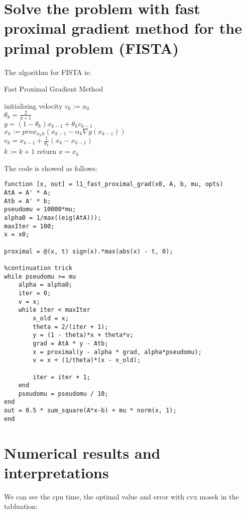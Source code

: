 \documentclass[11pt, oneside]{article}   	%
\begin{document}
\section{Solve the problem with fast proximal gradient method for the primal problem (FISTA)}
The algorithm for FISTA is:\\
\begin{algorithm}[H]
  \SetAlgoNoLine
  \caption{Fast Proximal Gradient Method} 
  initializing velocity $v_{0}:=x_{0}$\\
  { 
  $\theta_k=\frac{2}{k+1}$\\  
  $y=(1-\theta_{k})x_{k-1}+\theta_{k}v_{k-1}$\\
  $x_{k}:=prox_{\alpha_{k}h}\left(x_{k-1}-\alpha_{k}\nabla g(x_{k-1})\right)$\\
  $v_{k}=x_{k-1}+\frac{1}{\theta_{k}}(x_{k}-x_{k-1})$\\
  $k:=k+1$
  }
  return $x=x_{k}$\; 
\end{algorithm}
The code is showed as follows:
\lstset{
 frame=single, 
breaklines=true,
language=MATLAB,
 }
\begin{lstlisting}
function [x, out] = l1_fast_proximal_grad(x0, A, b, mu, opts)
AtA = A' * A;
Atb = A' * b;
pseudomu = 10000*mu;
alpha0 = 1/max((eig(AtA))); 
maxIter = 100;
x = x0;

proximal = @(x, t) sign(x).*max(abs(x) - t, 0);

%continuation trick
while pseudomu >= mu
    alpha = alpha0;
    iter = 0;
    v = x;
    while iter < maxIter
        x_old = x;
        theta = 2/(iter + 1);
        y = (1 - theta)*x + theta*v;
        grad = AtA * y - Atb;
        x = proximal(y - alpha * grad, alpha*pseudomu);
        v = x + (1/theta)*(x - x_old);
        
        iter = iter + 1;
    end
    pseudomu = pseudomu / 10;
end
out = 0.5 * sum_square(A*x-b) + mu * norm(x, 1);
end
\end{lstlisting}

\section{Numerical results and interpretations}
We can see the cpu time, the optimal value and error with cvx mosek in the tabluation:
\end{document}
